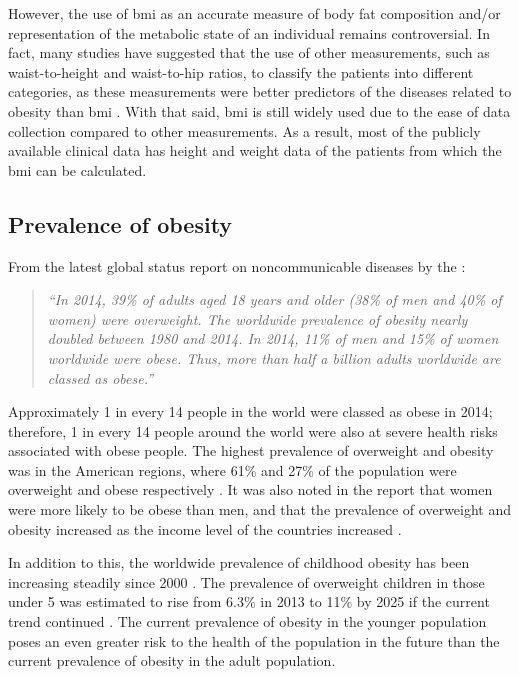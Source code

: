 However, the use of \gls{bmi} as an accurate measure of body fat composition and/or representation of the metabolic state of an individual remains controversial.
In fact, many studies have suggested that the use of other measurements, such as waist-to-height and waist-to-hip ratios, to classify the patients into different categories, as these measurements were better predictors of the diseases related to obesity than \gls{bmi} \citep{Dalton2003,Gelber2008,Lee2008}.
With that said, \gls{bmi} is still widely used due to the ease of data collection compared to other measurements.
As a result, most of the publicly available clinical data has height and weight data of the patients from which the \gls{bmi} can be calculated.

\subsection{Prevalence of obesity}
\label{sub:prevalence_of_obesity}

From the latest global status report on noncommunicable diseases by the \citet{WHO2014}:
\begin{quote}
	\textit{
		``In 2014, 39\% of adults aged 18 years and older (38\% of men and 40\% of women) were overweight.
		The worldwide prevalence of obesity nearly doubled between 1980 and 2014.
		In 2014, 11\% of men and 15\% of women worldwide were obese.
		Thus, more than half a billion adults worldwide are classed as obese.''
	}
\end{quote}

\noindent
Approximately 1 in every 14 people in the world were classed as obese in 2014; therefore, 1 in every 14 people around the world were also at severe health risks associated with obese people.
The highest prevalence of overweight and obesity was in the American regions, where 61\% and 27\% of the population were overweight and obese respectively \citep{WHO2014}.
It was also noted in the report that women were more likely to be obese than men, and that the prevalence of overweight and obesity increased as the income level of the countries increased \citep{WHO2014}.

In addition to this, the worldwide prevalence of childhood obesity has been increasing steadily since 2000 \citep{WHO2014}.
The prevalence of overweight children in those under 5 was estimated to rise from 6.3\% in 2013 to 11\% by 2025 if the current trend continued \citep{WHO2014}.
The current prevalence of obesity in the younger population poses an even greater risk to the health of the population in the future than the current prevalence of obesity in the adult population.

